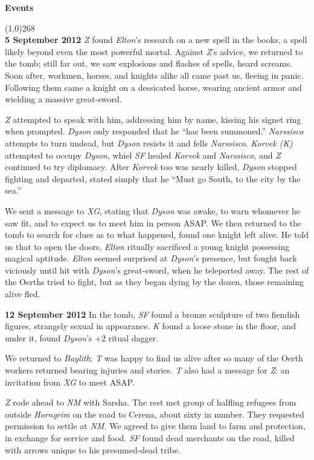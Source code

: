 \documentclass[letterpaper]{article}
\newcommand{\colline}{\line(1,0){268} \\}
\newcommand{\e}[1]{\emph{#1}}
\newcommand{\B}[1]{\textbf{#1}}
\newenvironment{notesection}[1]
{ {\huge \B{#1}} \par
\vspace{-0.75em}
\colline
\begingroup\fontsize{9pt}{12pt}\selectfont}
{\endgroup}
\begin{document}
\begin{notesection}{Events}
\B{5 September 2012} \e{Z} found \e{Elton}'s research on a new spell in the books, a spell likely beyond even the most powerful mortal. Against \e{Z}'s advice, we returned to the tomb; still far out, we saw explosions and flashes of spells, heard screams. Soon after, workmen, horses, and knights alike all came past us, fleeing in panic. Following them came a knight on a dessicated horse, wearing ancient armor and wielding a massive great-sword.

\e{Z} attempted to speak with him, addressing him by name, kissing his signet ring when prompted.  \e{Dyson} only responded that he ``has been summoned.'' \e{Narssisco} attempts to turn undead, but \e{Dyson} resists it and fells \e{Narssisco}. \e{Korvek (K)} attempted to occupy \e{Dyson}, whiel \e{SF} healed \e{Korvek} and \e{Narssisco}, and \e{Z} continued to try diplomacy. After \e{Korvek} too was nearly killed, \e{Dyson} stopped fighting and departed, stated simply that he ``Must go South, to the city by the sea.''

We sent a message to \e{XG}, stating that \e{Dyson} was awake, to warn whomever he saw fit, and to expect us to meet him in person ASAP. We then returned to the tomb to search for clues as to what happened, found one knight left alive. He told us that to open the doors, \e{Elton} ritually sacrificed a young knight possessing magical aptitude. \e{Elton} seemed surprised at \e{Dyson}'s presence, but fought back viciously until hit with \e{Dyson}'s great-sword, when he teleported away. The rest of the Oerths tried to fight, but as they began dying by the dozen, those remaining alive fled.

\B{12 September 2012} In the tomb, \e{SF} found a bronze sculpture of two fiendish figures, strangely sexual in appearance. \e{K} found a loose stone in the floor, and under it, found \e{Dyson}'s +2 ritual dagger.

We returned to \e{Baylith}; \e{T} was happy to find us alive after so many of the Oerth workers returned bearing injuries and stories. \e{T} also had a message for \e{Z}: an invitation from \e{XG} to meet ASAP.

\e{Z} rode ahead to \e{NM} with Sarsha. The rest met group of halfling refugees from outside \e{Horngrim} on the road to Cerena, about sixty in number. They requested permission to settle at \e{NM}. We agreed to give them land to farm and protection, in exchange for service and food. \e{SF} found dead merchants on the road, killed with arrows unique to his presumed-dead tribe.


\end{notesection}
\end{document}
